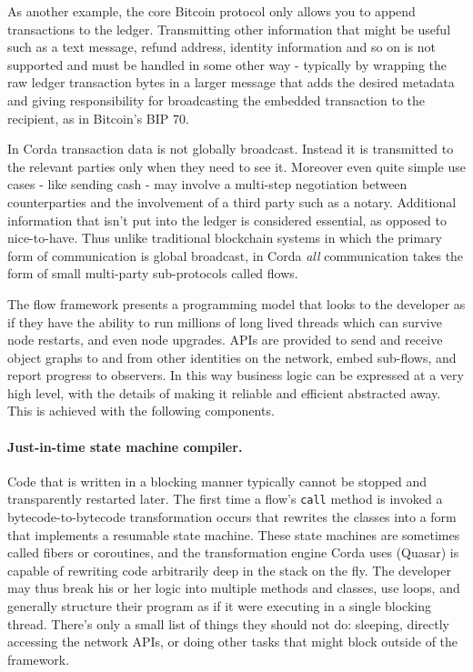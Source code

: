 \documentclass{article}
\begin{document}
As another example, the core Bitcoin protocol only allows you to append transactions to the ledger. Transmitting other
information that might be useful such as a text message, refund address, identity information and so on is not supported
and must be handled in some other way - typically by wrapping the raw ledger transaction bytes in a larger message that
adds the desired metadata and giving responsibility for broadcasting the embedded transaction to the recipient, as in
Bitcoin's BIP 70\cite{BIP70}.

In Corda transaction data is not globally broadcast. Instead it is transmitted to the relevant parties only when they
need to see it. Moreover even quite simple use cases - like sending cash - may involve a multi-step negotiation between
counterparties and the involvement of a third party such as a notary. Additional information that isn't put into the
ledger is considered essential, as opposed to nice-to-have. Thus unlike traditional blockchain systems in which the primary
form of communication is global broadcast, in Corda \emph{all} communication takes the form of small multi-party sub-protocols
called flows.

The flow framework presents a programming model that looks to the developer as if they have the ability to run millions
of long lived threads which can survive node restarts, and even node upgrades. APIs are provided to send and receive
object graphs to and from other identities on the network, embed sub-flows, and report progress to observers. In this
way business logic can be expressed at a very high level, with the details of making it reliable and efficient
abstracted away. This is achieved with the following components.

\paragraph{Just-in-time state machine compiler.}Code that is written in a blocking manner typically cannot be stopped
and transparently restarted later. The first time a flow's \texttt{call} method is invoked a bytecode-to-bytecode
transformation occurs that rewrites the classes into a form that implements a resumable state machine. These state
machines are sometimes called fibers or coroutines, and the transformation engine Corda uses (Quasar) is capable of rewriting
code arbitrarily deep in the stack on the fly. The developer may thus break his or her logic into multiple methods and
classes, use loops, and generally structure their program as if it were executing in a single blocking thread. There's only a
small list of things they should not do: sleeping, directly accessing the network APIs, or doing other tasks that might
block outside of the framework.
\end{document}
